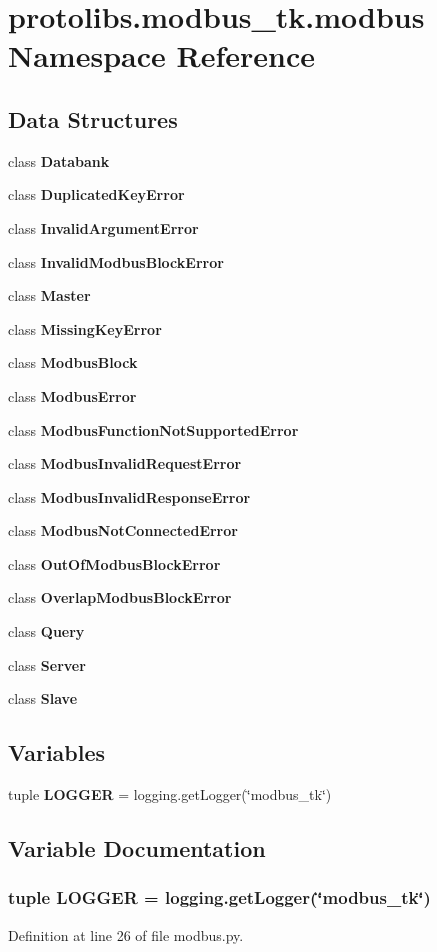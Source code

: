 \section{protolibs.\+modbus\+\_\+tk.\+modbus Namespace Reference}
\label{namespaceprotolibs_1_1modbus__tk_1_1modbus}
\subsection*{Data Structures}
\begin{DoxyCompactItemize}
\item 
class {\bf Databank}
\item 
class {\bf Duplicated\+Key\+Error}
\item 
class {\bf Invalid\+Argument\+Error}
\item 
class {\bf Invalid\+Modbus\+Block\+Error}
\item 
class {\bf Master}
\item 
class {\bf Missing\+Key\+Error}
\item 
class {\bf Modbus\+Block}
\item 
class {\bf Modbus\+Error}
\item 
class {\bf Modbus\+Function\+Not\+Supported\+Error}
\item 
class {\bf Modbus\+Invalid\+Request\+Error}
\item 
class {\bf Modbus\+Invalid\+Response\+Error}
\item 
class {\bf Modbus\+Not\+Connected\+Error}
\item 
class {\bf Out\+Of\+Modbus\+Block\+Error}
\item 
class {\bf Overlap\+Modbus\+Block\+Error}
\item 
class {\bf Query}
\item 
class {\bf Server}
\item 
class {\bf Slave}
\end{DoxyCompactItemize}
\subsection*{Variables}
\begin{DoxyCompactItemize}
\item 
tuple {\bf L\+O\+G\+G\+E\+R} = logging.\+get\+Logger(\char`\"{}modbus\+\_\+tk\char`\"{})
\end{DoxyCompactItemize}


\subsection{Variable Documentation}
\subsubsection[{L\+O\+G\+G\+E\+R}]{\setlength{\rightskip}{0pt plus 5cm}tuple L\+O\+G\+G\+E\+R = logging.\+get\+Logger(\char`\"{}modbus\+\_\+tk\char`\"{})}\label{namespaceprotolibs_1_1modbus__tk_1_1modbus_ae9c29667350ae00a0837fc1e77c279e2}


Definition at line 26 of file modbus.\+py.


